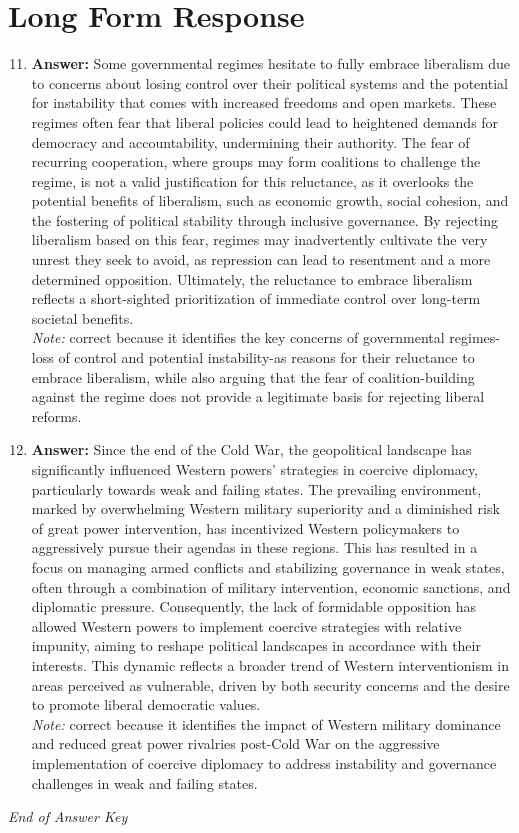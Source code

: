 \documentclass[12pt]{article}
\begin{document}
\section*{Long Form Response}
\begin{enumerate}[label=\arabic*.]
\setcounter{enumi}{10}
\item \textbf{Answer:} Some governmental regimes hesitate to fully embrace liberalism due to concerns about losing control over their political systems and the potential for instability that comes with increased freedoms and open markets. These regimes often fear that liberal policies could lead to heightened demands for democracy and accountability, undermining their authority. The fear of recurring cooperation, where groups may form coalitions to challenge the regime, is not a valid justification for this reluctance, as it overlooks the potential benefits of liberalism, such as economic growth, social cohesion, and the fostering of political stability through inclusive governance. By rejecting liberalism based on this fear, regimes may inadvertently cultivate the very unrest they seek to avoid, as repression can lead to resentment and a more determined opposition. Ultimately, the reluctance to embrace liberalism reflects a short-sighted prioritization of immediate control over long-term societal benefits.
\\ \textit{Note:} correct because it identifies the key concerns of governmental regimes-loss of control and potential instability-as reasons for their reluctance to embrace liberalism, while also arguing that the fear of coalition-building against the regime does not provide a legitimate basis for rejecting liberal reforms.
\item \textbf{Answer:} Since the end of the Cold War, the geopolitical landscape has significantly influenced Western powers' strategies in coercive diplomacy, particularly towards weak and failing states. The prevailing environment, marked by overwhelming Western military superiority and a diminished risk of great power intervention, has incentivized Western policymakers to aggressively pursue their agendas in these regions. This has resulted in a focus on managing armed conflicts and stabilizing governance in weak states, often through a combination of military intervention, economic sanctions, and diplomatic pressure. Consequently, the lack of formidable opposition has allowed Western powers to implement coercive strategies with relative impunity, aiming to reshape political landscapes in accordance with their interests. This dynamic reflects a broader trend of Western interventionism in areas perceived as vulnerable, driven by both security concerns and the desire to promote liberal democratic values.
\\ \textit{Note:} correct because it identifies the impact of Western military dominance and reduced great power rivalries post-Cold War on the aggressive implementation of coercive diplomacy to address instability and governance challenges in weak and failing states.
\end{enumerate}

\vfill
\noindent\textit{End of Answer Key}
\end{document}
